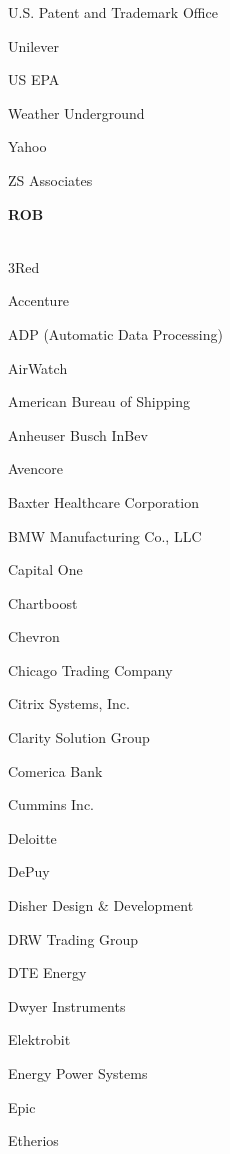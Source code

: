 \documentclass[twoside]{article}
\begin{document}
\begin{center}
\begin{multicols}{5}
\begin{FlushLeft}
\begin{compactitem}
\item U.S. Patent and Trademark Office
\item Unilever
\item US EPA
\item Weather Underground
\item Yahoo
\item ZS Associates
\end{compactitem}
        \end{FlushLeft}
        \vspace{1em}
        {\fontsize{14}{16}\selectfont \bf ROB}\\
        \vspace{-1em}
        ~\hrulefill~
        \vspace{-.9em}
        \begin{FlushLeft}
        \begin{compactitem}
        \item 3Red
\item Accenture
\item ADP (Automatic Data Processing)
\item AirWatch
\item American Bureau of Shipping
\item Anheuser Busch InBev
\item Avencore
\item Baxter Healthcare Corporation
\item BMW Manufacturing Co., LLC
\item Capital One
\item Chartboost
\item Chevron
\item Chicago Trading Company
\item Citrix Systems, Inc.
\item Clarity Solution Group
\item Comerica Bank
\item Cummins Inc.
\item Deloitte
\item DePuy
\item Disher Design \& Development
\item DRW Trading Group
\item DTE Energy
\item Dwyer Instruments
\item Elektrobit
\item Energy Power Systems
\item Epic
\item Etherios

\end{compactitem}
\end{FlushLeft}
\end{multicols}
\end{center}
\end{document}
